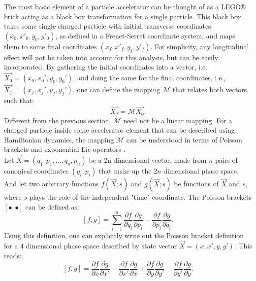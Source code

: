 The most basic element of a particle accelerator can be thought of as a LEGO® brick acting as a black box transformation for a single particle. This black box takes some single charged particle with initial transverse coordinates $\left( x_0,x'_0,y_0,y'_0 \right)$, as defined in a Frenet-Serret coordinate system, and maps them to some final coordinates $\left( x_f,x'_f,y_f,y'_f \right)$. For simplicity, any longitudinal effect will not be taken into account for this analysis, but can be easily incorporated. By gathering the initial coordinates into a vector, i.e. $\vec{X_0} = \left( x_0,x_0',y_0,y_0' \right)$, and doing the same for the final coordinates, i.e., $\vec{X_f} = \left( x_f,x_f',y_f,y_f' \right)$, one can define the mapping $\mathcal{M}$ that relates both vectors, such that:  
\begin{equation}
\label{eq:ch2map}
\vec{X_f}=\mathcal{M}\vec{X_0}.
\end{equation}
Different from the previous section, $\mathcal{M}$ need not be a linear mapping. For a charged particle inside some accelerator element that can be described using Hamiltonian dynamics, the mapping $\mathcal{M}$ can be understood in terms of Poisson brackets and exponential Lie operators \cite{wolski,todd1,cernthesis1,cernthesis2,forest}.\\
Let $\vec{X} = \left( q_1,p_1,\dots,q_{n},p_{n} \right)$ be a 2n dimensional vector, made from $n$ pairs of canonical coordinates $(q_i,p_i)$ that make up the 2$n$ dimensional phase space. And let two arbitrary functions $f\left( \vec{X};s\right)$ and $g\left( \vec{X};s\right)$ be functions of $\vec{X}$ and $s$, where $s$ plays the role of the independent "time" coordinate. The Poisson brackets $\left[ \bullet , \bullet \right]$ can be defined as:
\begin{equation}
    \label{eq:ch2poisson}
    \left[ f,g \right] = \sum_{i=1}^{n} \frac{\partial f}{\partial q_i}\frac{\partial g}{\partial p_i} - \frac{\partial f}{\partial p_i}\frac{\partial g}{\partial q_i}. 
\end{equation}
Using this definition, one can explicitly write out the Poisson bracket definition for a 4 dimensional phase space described by state vector $\vec{X} = \left( x,x',y,y' \right)$. This reads: 
\begin{equation}
    \label{eq:ch2poisson1}
    \left[ f,g \right] = \frac{\partial f}{\partial x}\frac{\partial g}{\partial x'} - \frac{\partial f}{\partial x'}\frac{\partial g}{\partial x} + \frac{\partial f}{\partial y}\frac{\partial g}{\partial y'} - \frac{\partial f}{\partial y'}\frac{\partial g}{\partial y}. 
\end{equation}\\
